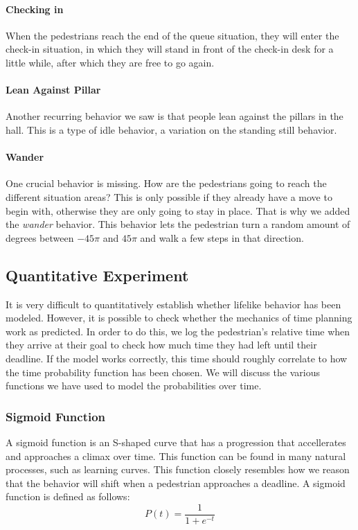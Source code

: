 \documentclass[11pt]{book}
\begin{document}
\paragraph{Checking in}
When the pedestrians reach the end of the queue situation, they will enter the check-in situation, in which they will stand in front of the check-in desk for a little while, after which they are free to go again.

\paragraph{Lean Against Pillar}
Another recurring behavior we saw is that people lean against the pillars in the hall. This is a type of idle behavior, a variation on the standing still behavior.

\paragraph{Wander}
One crucial behavior is missing. How are the pedestrians going to reach the different situation areas? This is only possible if they already have a move to begin with, otherwise they are only going to stay in place. That is why we added the \emph{wander} behavior. This behavior lets the pedestrian turn a random amount of degrees between $-45\pi$ and $45\pi$ and walk a few steps in that direction.

\subsection{Quantitative Experiment}
It is very difficult to quantitatively establish whether lifelike behavior has been modeled. However, it is possible to check whether the mechanics of time planning work as predicted. In order to do this, we log the pedestrian's relative time when they arrive at their goal to check how much time they had left until their deadline. If the model works correctly, this time should roughly correlate to how the time probability function has been chosen. We will discuss the various functions we have used to model the probabilities over time.

\subsubsection{Sigmoid Function}
A sigmoid function is an S-shaped curve that has a progression that accellerates and approaches a climax over time. This function can be found in many natural processes, such as learning curves. This function closely resembles how we reason that the behavior will shift when a pedestrian approaches a deadline.
A sigmoid function is defined as follows:
\begin{equation}
P(t) = \frac{1}{1+e^{-t}}
\end{equation}
\end{document}
